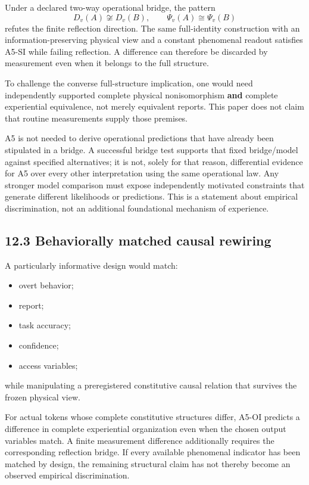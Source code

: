 \documentclass[
  11pt,
  a4paper,
]{article}
\providecommand{\tightlist}{%
  \setlength{\itemsep}{0pt}\setlength{\parskip}{0pt}}
\begin{document}
Under a declared two-way operational bridge, the pattern \[
D_v(A)\not\cong D_v(B),\qquad \Psi_v(A)\cong\Psi_v(B)
\] refutes the finite reflection direction. The same full-identity
construction with an information-preserving physical view and a constant
phenomenal readout satisfies A5-SI while failing reflection. A
difference can therefore be discarded by measurement even when it
belongs to the full structure.

To challenge the converse full-structure implication, one would need
independently supported complete physical nonisomorphism \textbf{and}
complete experiential equivalence, not merely equivalent reports. This
paper does not claim that routine measurements supply those premises.

A5 is not needed to derive operational predictions that have already
been stipulated in a bridge. A successful bridge test supports that
fixed bridge/model against specified alternatives; it is not, solely for
that reason, differential evidence for A5 over every other
interpretation using the same operational law. Any stronger model
comparison must expose independently motivated constraints that generate
different likelihoods or predictions. This is a statement about
empirical discrimination, not an additional foundational mechanism of
experience.

\hypertarget{behaviorally-matched-causal-rewiring}{%
\subsection{12.3 Behaviorally matched causal
rewiring}\label{behaviorally-matched-causal-rewiring}}

A particularly informative design would match:

\begin{itemize}
\tightlist
\item
  overt behavior;
\item
  report;
\item
  task accuracy;
\item
  confidence;
\item
  access variables;
\end{itemize}

while manipulating a preregistered constitutive causal relation that
survives the frozen physical view.

For actual tokens whose complete constitutive structures differ, A5-OI
predicts a difference in complete experiential organization even when
the chosen output variables match. A finite measurement difference
additionally requires the corresponding reflection bridge. If every
available phenomenal indicator has been matched by design, the remaining
structural claim has not thereby become an observed empirical
discrimination.
\end{document}
